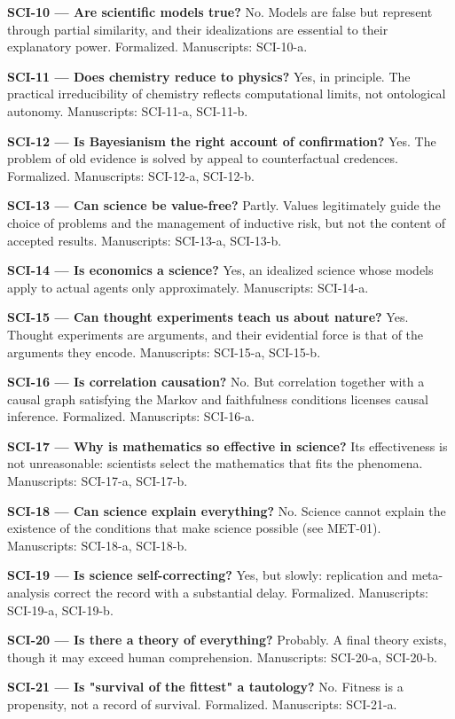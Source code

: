 \documentclass[10pt]{article}
\begin{document}
\textbf{SCI-10 --- Are scientific models true?} No. Models are false but represent through partial similarity, and their idealizations are essential to their explanatory power. Formalized. Manuscripts: SCI-10-a.

\textbf{SCI-11 --- Does chemistry reduce to physics?} Yes, in principle. The practical irreducibility of chemistry reflects computational limits, not ontological autonomy. Manuscripts: SCI-11-a, SCI-11-b.

\textbf{SCI-12 --- Is Bayesianism the right account of confirmation?} Yes. The problem of old evidence is solved by appeal to counterfactual credences. Formalized. Manuscripts: SCI-12-a, SCI-12-b.

\textbf{SCI-13 --- Can science be value-free?} Partly. Values legitimately guide the choice of problems and the management of inductive risk, but not the content of accepted results. Manuscripts: SCI-13-a, SCI-13-b.

\textbf{SCI-14 --- Is economics a science?} Yes, an idealized science whose models apply to actual agents only approximately. Manuscripts: SCI-14-a.

\textbf{SCI-15 --- Can thought experiments teach us about nature?} Yes. Thought experiments are arguments, and their evidential force is that of the arguments they encode. Manuscripts: SCI-15-a, SCI-15-b.

\textbf{SCI-16 --- Is correlation causation?} No. But correlation together with a causal graph satisfying the Markov and faithfulness conditions licenses causal inference. Formalized. Manuscripts: SCI-16-a.

\textbf{SCI-17 --- Why is mathematics so effective in science?} Its effectiveness is not unreasonable: scientists select the mathematics that fits the phenomena. Manuscripts: SCI-17-a, SCI-17-b.

\textbf{SCI-18 --- Can science explain everything?} No. Science cannot explain the existence of the conditions that make science possible (see MET-01). Manuscripts: SCI-18-a, SCI-18-b.

\textbf{SCI-19 --- Is science self-correcting?} Yes, but slowly: replication and meta-analysis correct the record with a substantial delay. Formalized. Manuscripts: SCI-19-a, SCI-19-b.

\textbf{SCI-20 --- Is there a theory of everything?} Probably. A final theory exists, though it may exceed human comprehension. Manuscripts: SCI-20-a, SCI-20-b.

\textbf{SCI-21 --- Is "survival of the fittest" a tautology?} No. Fitness is a propensity, not a record of survival. Formalized. Manuscripts: SCI-21-a.
\end{document}
